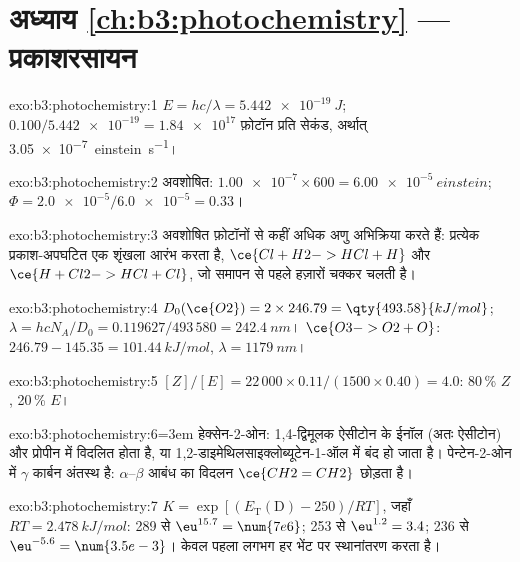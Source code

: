 \section*{अध्याय \ref{ch:b3:photochemistry} --- प्रकाशरसायन}

\begin{solution}{exo:b3:photochemistry:1}
$E = hc/\lambda = \qty{5.442e-19}{J}$; $0.100/\num{5.442e-19} = \num{1.84e17}$ फ़ोटॉन प्रति सेकंड, अर्थात्
\qty{3.05e-7}{einstein.s^{-1}}।
\end{solution}

\begin{solution}{exo:b3:photochemistry:2}
अवशोषित: $\num{1.00e-7} \times 600 = \qty{6.00e-5}{einstein}$; $\Phi = \num{2.0e-5}/\num{6.0e-5} = 0.33$।
\end{solution}

\begin{solution}{exo:b3:photochemistry:3}
अवशोषित फ़ोटॉनों से कहीं अधिक अणु अभिक्रिया करते हैं: प्रत्येक प्रकाश-अपघटित  एक
शृंखला आरंभ करता है, $\ce{Cl + H2 -> HCl + H}$ और $\ce{H + Cl2 -> HCl + Cl}$, जो समापन से पहले
हज़ारों चक्कर चलती है।
\end{solution}

\begin{solution}{exo:b3:photochemistry:4}
$D_0(\ce{O2}) = 2 \times 246.79 = \qty{493.58}{kJ/mol}$; $\lambda = hcN_A/D_0 = 0.119627/493\,580 =
\qty{242.4}{nm}$। $\ce{O3 -> O2 + O}$: $246.79 - 145.35 = \qty{101.44}{kJ/mol}$, $\lambda = \qty{1179}{nm}$।
\end{solution}

\begin{solution}{exo:b3:photochemistry:5}
$[Z]/[E] = 22\,000 \times 0.11/(1500 \times 0.40) = 4.0$: 80\,\% $Z$, 20\,\% $E$।
\end{solution}

\begin{solution}{exo:b3:photochemistry:6}\emergencystretch=3em
हेक्सेन-2-ओन: 1,4-द्विमूलक ऐसीटोन के ईनॉल (अतः ऐसीटोन) और
प्रोपीन में विदलित होता है, या 1,2-डाइमेथिल\-साइक्लोब्यूटेन-1-ऑल में बंद हो जाता है। पेन्टेन-2-ओन में $\gamma$
कार्बन अंतस्थ  है: $\alpha$--$\beta$ आबंध का विदलन $\ce{CH2=CH2}$ छोड़ता है।
\end{solution}

\begin{solution}{exo:b3:photochemistry:7}
$K = \exp[(E_{\mathrm T}(\mathrm D) - 250)/RT]$, जहाँ $RT = \qty{2.478}{kJ/mol}$: 289 से $\eu^{15.7} = \num{7e6}$;
253 से $\eu^{1.2} = 3.4$; 236 से $\eu^{-5.6} = \num{3.5e-3}$। केवल पहला लगभग हर भेंट पर
स्थानांतरण करता है।
\end{solution}

